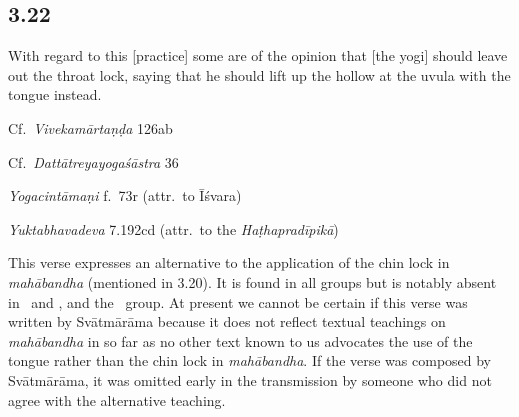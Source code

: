 \begin{ekdosis}

\subsection*{3.22}
\begin{translation}[hp03_022]
With regard to this [practice] some are of the opinion that [the yogi] should leave out the throat lock, saying that he should lift up the hollow at the uvula with the tongue instead.
\end{translation}

\begin{sources}[hp03_022]
Cf.~\emph{Vivekamārtaṇḍa} 126ab
\begin{versinnote}
\end{versinnote}
Cf.~\emph{Dattātreyayogaśāstra} 36
\begin{versinnote}
\end{versinnote}
\end{sources}

\begin{testimonia}[hp03_022]
\emph{Yogacintāmaṇi} f.~73r (attr.~to Īśvara)%
\begin{versinnote}
\end{versinnote}

\emph{Yuktabhavadeva} 7.192cd (attr.~to the \emph{Haṭhapradīpikā})
\begin{versinnote}
\end{versinnote}
\end{testimonia}

\begin{philcomm}[hp03_022]
This verse expresses an alternative to the application of the chin lock in \emph{mahā\-bandha} (mentioned in 3.20). It is found in all groups but is notably absent in \alphaOne\ and \alphaTwo, and the \textbeta\ group. At present we cannot be certain if this verse was written by Svātmārāma because it does not reflect textual teachings on \emph{mahābandha} in so far as no other text known to us advocates the use of the tongue rather than the chin lock in \emph{mahābandha}. If the verse was composed by Svātmārāma, it was omitted early in the transmission by someone who did not agree with the alternative teaching.


\end{philcomm}
\end{ekdosis}
